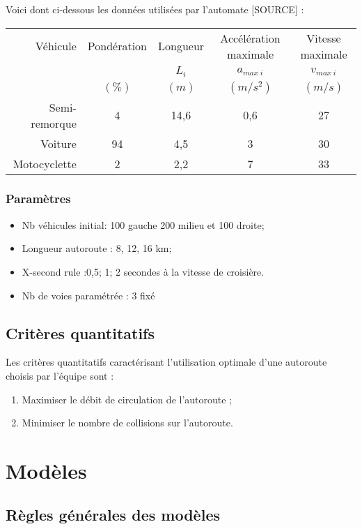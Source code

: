 \documentclass[12pt,letterpaper]{article}
\begin{document}
\vspace{0.4cm}
Voici dont ci-dessous les données utilisées par l'automate [SOURCE] :

\vspace{0.4cm}
\begin{tabular}{|r|c|c|c|c|}
\hline
Véhicule & Pondération & Longueur & Accélération maximale & Vitesse maximale \\
& & $L_{i}$ & $a_{max\: i}$ & $v_{max\: i}$ \\
& $(\%)$ & $(m)$ & $(m/s^{2})$ & $(m/s)$ \\
\hline
Semi-remorque & 4 & 14,6 & 0,6 & 27 \\
Voiture & 94	 & 4,5 & 3 & 30 \\
Motocyclette & 2 & 2,2 & 7 & 33 \\
\hline
\end{tabular}

\vspace{0.4cm}
\subsubsection{Paramètres}
\begin{itemize}
	\item Nb véhicules initial: 100 gauche 200 milieu et 100 droite;
	\item Longueur autoroute : 8, 12, 16 km;
	\item X-second rule :0,5; 1; 2 secondes à la vitesse de croisière.
	\item Nb de voies paramétrée : 3 fixé 
\end{itemize}

\subsection{Critères quantitatifs} 
Les critères quantitatifs caractérisant l'utilisation optimale d'une autoroute choisis par l'équipe sont : 
\begin{enumerate}
\item Maximiser le débit de circulation de l'autoroute ;
\item Minimiser le nombre de collisions sur l'autoroute. 
\end{enumerate}

\section{Modèles}

\subsection{Règles générales des modèles}
\end{document}
